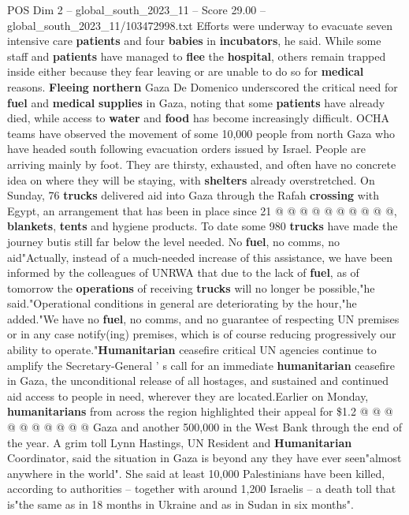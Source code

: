 \begin{textsample}{POS Dim 2 – global\_south\_2023\_11 – Score 29.00 – global\_south\_2023\_11/103472998.txt}
Efforts were underway to evacuate seven intensive care \textbf{patients} and four \textbf{babies} in \textbf{incubators}, he said.
While some staff and \textbf{patients} have managed to \textbf{flee} the \textbf{hospital}, others remain trapped inside either because they fear leaving or are unable to do so for \textbf{medical} reasons. \textbf{Fleeing} \textbf{northern} Gaza De Domenico underscored the critical need for \textbf{fuel} and \textbf{medical} \textbf{supplies} in Gaza, noting that some \textbf{patients} have already died, while access to \textbf{water} and \textbf{food} has become increasingly difficult.
OCHA teams have observed the movement of some 10,000 people from north Gaza who have headed south following evacuation orders issued by Israel.
People are arriving mainly by foot.
They are thirsty, exhausted, and often have no concrete idea on where they will be staying, with \textbf{shelters} already overstretched.
On Sunday, 76 \textbf{trucks} delivered aid into Gaza through the Rafah \textbf{crossing} with Egypt, an arrangement that has been in place since 21 @ @ @ @ @ @ @ @ @ @, \textbf{blankets}, \textbf{tents} and hygiene products.
To date some 980 \textbf{trucks} have made the journey butis still far below the level needed.
No \textbf{fuel}, no comms, no aid"Actually, instead of a much-needed increase of this assistance, we have been informed by the colleagues of UNRWA that due to the lack of \textbf{fuel}, as of tomorrow the \textbf{operations} of receiving \textbf{trucks} will no longer be possible,"he said."Operational conditions in general are deteriorating by the hour,"he added."We have no \textbf{fuel}, no comms, and no guarantee of respecting UN premises or in any case notify(ing) premises, which is of course reducing progressively our ability to operate."\textbf{Humanitarian} ceasefire critical UN agencies continue to amplify the Secretary-General ' s call for an immediate \textbf{humanitarian} ceasefire in Gaza, the unconditional release of all hostages, and sustained and continued aid access to people in need, wherever they are located.Earlier on Monday, \textbf{humanitarians} from across the region highlighted their appeal for \$1.2 @ @ @ @ @ @ @ @ @ @ Gaza and another 500,000 in the West Bank through the end of the year.
A grim toll Lynn Hastings, UN Resident and \textbf{Humanitarian} Coordinator, said the situation in Gaza is beyond any they have ever seen"almost anywhere in the world".
She said at least 10,000 Palestinians have been killed, according to authorities -- together with around 1,200 Israelis -- a death toll that is"the same as in 18 months in Ukraine and as in Sudan in six months".

\end{textsample}
